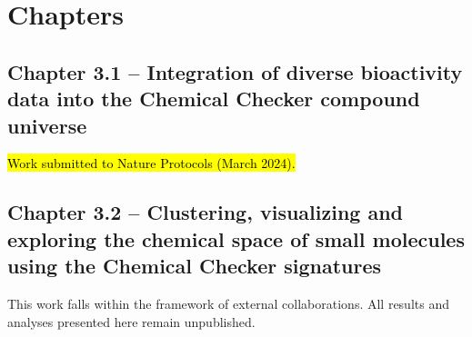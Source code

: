 
\chapter{Chapters}
\newpage


\section[Integration of diverse bioactivity data into the Chemical Checker compound universe]{Chapter 3.1 -- Integration of diverse bioactivity data into the Chemical Checker compound universe}
\label{Chapter_3.1}
\setcounter{figure}{0}
\renewcommand{\thefigure}{3.\arabic{section}.\arabic{figure}}
\hl{Work submitted to Nature Protocols (March 2024).}








\newpage



\section[Clustering, visualizing and exploring the chemical space of small molecules using the Chemical Checker signatures]{Chapter 3.2 -- Clustering, visualizing and exploring the chemical space of small molecules using the Chemical Checker signatures}
\label{Chapter_3.2}
\setcounter{figure}{0}
\renewcommand{\thefigure}{3.\arabic{section}.\arabic{figure}}
This work falls within the framework of external collaborations. All results and analyses presented here remain unpublished. 

